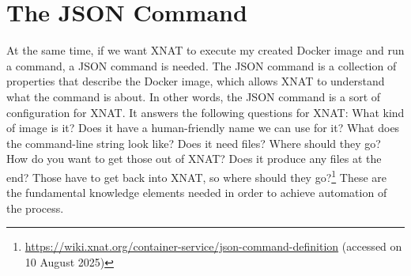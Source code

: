 \section{The JSON Command}
At the same time, if we want XNAT to execute my created Docker image and run a command, a \ac{JSON} command is needed. The JSON command is a collection of properties that describe the Docker image, which allows XNAT to understand what the command is about. In other words, the JSON command is a sort of configuration for XNAT. It answers the following questions for XNAT: What kind of image is it? Does it have a human-friendly name we can use for it? What does the command-line string look like? Does it need files? Where should they go? How do you want to get those out of XNAT? Does it produce any files at the end? Those have to get back into XNAT, so where should they go?\footnote{\url{https://wiki.xnat.org/container-service/json-command-definition} (accessed on 10 August 2025)} These are the fundamental knowledge elements needed in order to achieve automation of the process.





